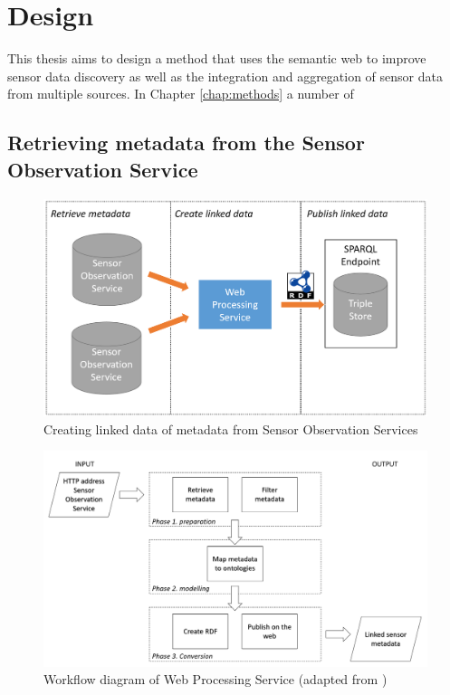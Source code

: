 

\chapter{Design}
\label{chap:impl}

This thesis aims to design a method that uses the semantic web to improve sensor data discovery as well as the integration and aggregation of sensor data from multiple sources. In Chapter \ref{chap:methods} a number of  

\section{Retrieving metadata from the Sensor Observation Service}
\label{chap:retrieveSOS}

\begin{figure}
	\centering
	\includegraphics[width=1\linewidth]{UML/wps1diagram.PNG}
	\caption{Creating linked data of metadata from Sensor Observation Services}
	\label{fig:WPS1}
\end{figure}

\begin{figure}
	\centering
	\includegraphics[width=1\linewidth]{UML/wps1workflow.PNG}
	\caption{Workflow diagram of Web Processing Service (adapted from \cite{LD:Missier})}
	\label{fig:WPS1workflow}
\end{figure}



